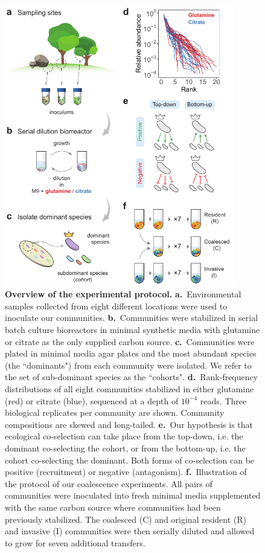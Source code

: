 \documentclass[a4paper,10pt]{article}
\begin{document}
\begin{figure}[!h]
\centering
\internallinenumbers
\includegraphics[width=10cm,keepaspectratio]{figs/fig1.pdf}
\caption{\textbf{Overview of the experimental protocol.}
\textbf{a.}~Environmental samples collected from eight different locations were used
to inoculate our communities.
\textbf{b.}~Communities were stabilized in serial batch culture bioreactors
\cite{Goldford2018} in minimal synthetic media with glutamine or citrate as the
only supplied carbon source.
\textbf{c.}~Communities were plated in minimal media agar plates and the most abundant
species (the ``dominants") from each community were isolated. We refer to the set of
sub-dominant species as the ``cohorts".
\textbf{d.}~Rank-frequency distributions of all eight communities stabilized in either
glutamine (red) or citrate (blue), sequenced at a depth of $10^{-4}$ reads.
Three biological replicates per community are shown.
Community compositions are skewed and long-tailed.
\textbf{e.}~Our hypothesis is that ecological co-selection can take place from the top-down,
i.e. the dominant co-selecting the cohort, or from the bottom-up, i.e. the cohort co-selecting
the dominant. Both forms of co-selection can be positive (recruitment) or negative
(antagonism).
\textbf{f.}~Illustration of the protocol of our coalescence experiments. All pairs of
communities were inoculated into fresh minimal media supplemented with the same carbon
source where communities had been previously stabilized. The coalesced (C) and original
resident (R) and invasive (I) communities were then serially diluted and allowed to grow
for seven additional transfers.}
\label{fig1}
\end{figure}
\end{document}
